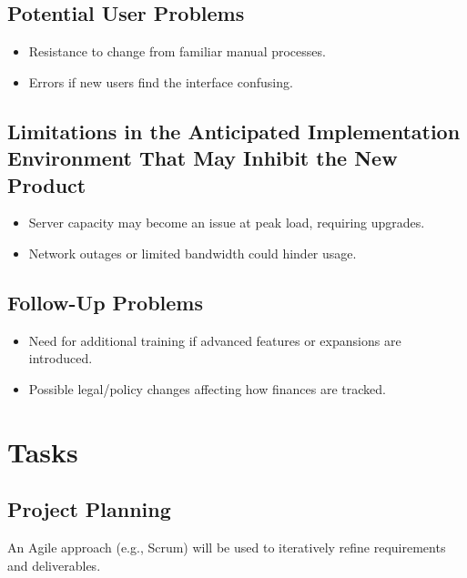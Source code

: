 \documentclass[12pt]{article}
\begin{document}
\subsection{Potential User Problems}
\begin{itemize}
    \item Resistance to change from familiar manual processes.
    \item Errors if new users find the interface confusing.
\end{itemize}

\subsection{Limitations in the Anticipated Implementation Environment That May Inhibit the New Product}
\begin{itemize}
    \item Server capacity may become an issue at peak load, requiring upgrades.
    \item Network outages or limited bandwidth could hinder usage.
\end{itemize}

\subsection{Follow-Up Problems}
\begin{itemize}
    \item Need for additional training if advanced features or expansions are introduced.
    \item Possible legal/policy changes affecting how finances are tracked.
\end{itemize}

\section{Tasks}
\subsection{Project Planning}
An Agile approach (e.g., Scrum) will be used to iteratively refine requirements and deliverables.
\end{document}
